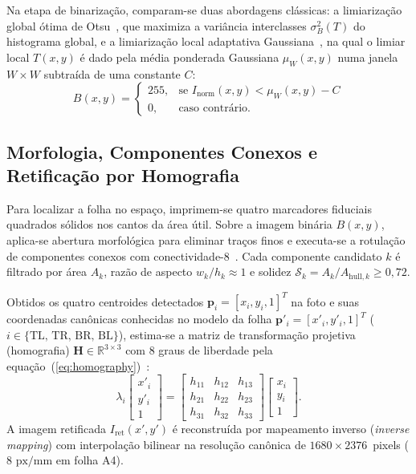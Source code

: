 \documentclass[11pt]{article}
\begin{document}
Na etapa de binarização, comparam-se duas abordagens clássicas: a limiarização global ótima de Otsu~\cite{otsu1979}, que maximiza a variância interclasses $\sigma_B^2(T)$ do histograma global, e a limiarização local adaptativa Gaussiana~\cite{bradley2007}, na qual o limiar local $T(x,y)$ é dado pela média ponderada Gaussiana $\mu_W(x,y)$ numa janela $W \times W$ subtraída de uma constante $C$:
\begin{equation} \label{eq:adaptive}
B(x,y) = \begin{cases}
255, & \text{se } I_{\text{norm}}(x,y) < \mu_W(x,y) - C \\
0,   & \text{caso contrário.}
\end{cases}
\end{equation}

\subsection{Morfologia, Componentes Conexos e Retificação por Homografia}

Para localizar a folha no espaço, imprimem-se quatro marcadores fiduciais quadrados sólidos nos cantos da área útil. Sobre a imagem binária $B(x,y)$, aplica-se abertura morfológica para eliminar traços finos e executa-se a rotulação de componentes conexos com conectividade-8~\cite{gonzalez2018}. Cada componente candidato $k$ é filtrado por área $A_k$, razão de aspecto $w_k / h_k \approx 1$ e solidez $\mathcal{S}_k = A_k / A_{\text{hull},k} \ge 0{,}72$.

Obtidos os quatro centroides detectados $\mathbf{p}_i = [x_i, y_i, 1]^T$ na foto e suas coordenadas canônicas conhecidas no modelo da folha $\mathbf{p}'_i = [x'_i, y'_i, 1]^T$ ($i \in \{\text{TL, TR, BR, BL}\}$), estima-se a matriz de transformação projetiva (homografia) $\mathbf{H} \in \mathbb{R}^{3\times 3}$ com 8 graus de liberdade pela equação~(\ref{eq:homography})~\cite{hartley2004}:
\begin{equation} \label{eq:homography}
\lambda_i \begin{bmatrix} x'_i \\ y'_i \\ 1 \end{bmatrix} = \begin{bmatrix} h_{11} & h_{12} & h_{13} \\ h_{21} & h_{22} & h_{23} \\ h_{31} & h_{32} & h_{33} \end{bmatrix} \begin{bmatrix} x_i \\ y_i \\ 1 \end{bmatrix}.
\end{equation}
A imagem retificada $I_{\text{ret}}(x',y')$ é reconstruída por mapeamento inverso (\textit{inverse mapping}) com interpolação bilinear na resolução canônica de $1680 \times 2376$~pixels ($8\text{ px/mm}$ em folha A4).
\end{document}
